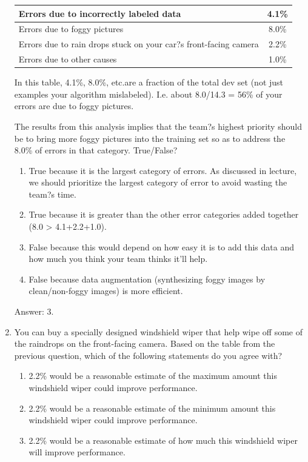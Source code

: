\documentclass[12pt]{article}
\numberwithin{equation}{section}
\begin{document}
\begin{enumerate}
\begin{table}[H]
\begin{tabular}{l|c}
    			Errors due to incorrectly labeled data & 4.1\%\\ \hline
    			Errors due to foggy pictures & 8.0\%\\ \hline
    			Errors due to rain drops stuck on your car?s front-facing camera & 2.2\%\\ \hline
			Errors due to other causes & 1.0\% \\
  		\end{tabular}
	\end{table} \par
	In this table, 4.1\%, 8.0\%, etc.are a fraction of the total dev set (not just examples your algorithm mislabeled). I.e. about 8.0/14.3 = 56\% of your errors are due to foggy pictures.\par
	The results from this analysis implies that the team?s highest priority should be to bring more foggy pictures into the training set so as to address the 8.0\% of errors in that category. True/False?
	\begin{enumerate}
		\item True because it is the largest category of errors. As discussed in lecture, we should prioritize the largest category of error to avoid wasting the team?s time.
		\item True because it is greater than the other error categories added together (8.0 > 4.1+2.2+1.0).
		\item False because this would depend on how easy it is to add this data and how much you think your team thinks it'll help.
		\item False because data augmentation (synthesizing foggy images by clean/non-foggy images) is more efficient.
	\end{enumerate} \par
	Answer: 3.	
	\item You can buy a specially designed windshield wiper that help wipe off some of the raindrops on the front-facing camera. Based on the table from the previous question, which of the following statements do you agree with?
	\begin{enumerate}
		\item 2.2\% would be a reasonable estimate of the maximum amount this windshield wiper could improve performance.
		\item 2.2\% would be a reasonable estimate of the minimum amount this windshield wiper could improve performance.
		\item 2.2\% would be a reasonable estimate of how much this windshield wiper will improve performance.

\end{enumerate}
\end{enumerate}
\end{document}
